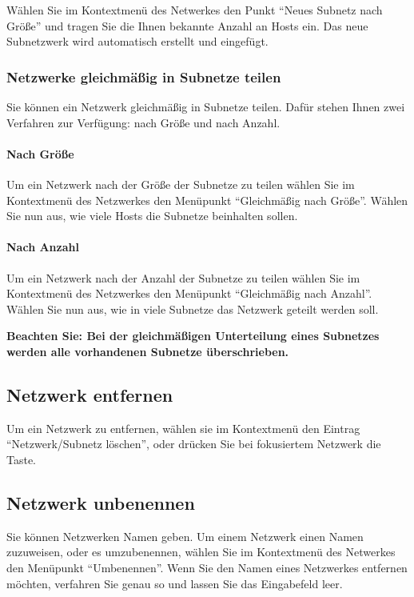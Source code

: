Wählen Sie im Kontextmenü des Netwerkes den Punkt "`Neues Subnetz nach Größe"' und tragen
Sie die Ihnen bekannte Anzahl an Hosts ein. Das neue Subnetzwerk wird automatisch erstellt 
und eingefügt.

\subsubsection{Netzwerke gleichmäßig in Subnetze teilen}
Sie können ein Netzwerk gleichmäßig in Subnetze teilen. Dafür stehen Ihnen zwei
Verfahren zur Verfügung: nach Größe und nach Anzahl.

\paragraph{Nach Größe}
Um ein Netzwerk nach der Größe der Subnetze zu teilen wählen Sie im Kontextmenü
des Netzwerkes den Menüpunkt "`Gleichmäßig nach Größe"'. Wählen Sie nun aus,
wie viele Hosts die Subnetze beinhalten sollen.

\paragraph{Nach Anzahl}
Um ein Netzwerk nach der Anzahl der Subnetze zu teilen wählen Sie im Kontextmenü
des Netzwerkes den Menüpunkt "`Gleichmäßig nach Anzahl"'. Wählen Sie nun aus, wie
in viele Subnetze das Netzwerk geteilt werden soll.

\textbf{Beachten Sie: Bei der gleichmäßigen Unterteilung eines Subnetzes werden alle
vorhandenen Subnetze überschrieben.}

\subsection{Netzwerk entfernen}
Um ein Netzwerk zu entfernen, wählen sie im Kontextmenü den Eintrag
"`Netzwerk/Subnetz löschen"', oder drücken Sie bei fokusiertem Netzwerk die
 Taste.

\subsection{Netzwerk unbenennen}
Sie können Netzwerken Namen geben. Um einem Netzwerk einen Namen zuzuweisen, oder
es umzubenennen, wählen Sie im Kontextmenü des Netwerkes den Menüpunkt
"`Umbenennen"'.
Wenn Sie den Namen eines Netzwerkes entfernen möchten, verfahren Sie genau so und lassen
Sie das Eingabefeld leer.